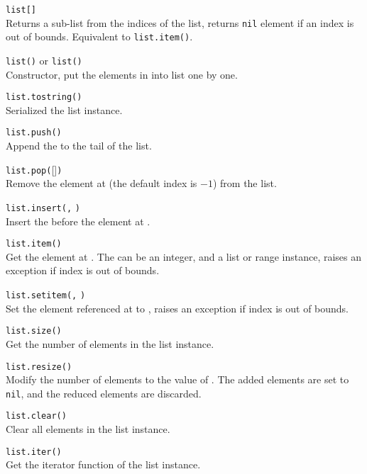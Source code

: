 \hangpar  \texttt{list[}\texttt{]}\\
Returns a sub-list from the indices of the list, returns \texttt{nil} element if an index is out of bounds. Equivalent to \texttt{list.item()}.

\hangpar \texttt{list()} or \texttt{list(}\texttt{)}\\
Constructor, put the elements in  into list one by one.

\hangpar \texttt{list.tostring()}\\
Serialized the list instance.

\hangpar \texttt{list.push(}\texttt{)}\\
Append the  to the tail of the list.

\hangpar \texttt{list.pop(}[]\texttt{)}\\
Remove the element at  (the default index is $-1$) from the list.

\hangpar \texttt{list.insert(}\texttt{,} \texttt{)}\\
Insert the  before the element at .

\hangpar \texttt{list.item(}\texttt{)}\\
Get the element at . The  can be an \textsf{integer}, and a \textsf{list} or \textsf{range} instance, raises an exception if index is out of bounds.

\hangpar \texttt{list.setitem(}\texttt{,} \texttt{)}\\
Set the element referenced at  to , raises an exception if index is out of bounds.

\hangpar \texttt{list.size()}\\
Get the number of elements in the list instance.

\hangpar \texttt{list.resize(}\texttt{)}\\
Modify the number of elements to the value of . The added elements are set to \texttt{nil}, and the reduced elements are discarded.

\hangpar \texttt{list.clear()}\\
Clear all elements in the list instance.

\hangpar \texttt{list.iter()}\\
Get the iterator function of the list instance.

